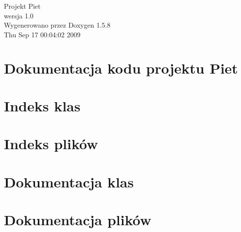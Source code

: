 \documentclass[a4paper]{book}
\begin{document}
\begin{titlepage}
\vspace*{7cm}
\begin{center}
{\Large Projekt Piet \\[1ex]\large wersja 1.0 }\\
\vspace*{1cm}
{\large Wygenerowano przez Doxygen 1.5.8}\\
\vspace*{0.5cm}
{\small Thu Sep 17 00:04:02 2009}\\
\end{center}
\end{titlepage}
\clearemptydoublepage
{}
\tableofcontents
\clearemptydoublepage
{}
\chapter{Dokumentacja kodu projektu Piet}
\label{index}\hypertarget{index}{}
\chapter{Indeks klas}

\chapter{Indeks plików}

\chapter{Dokumentacja klas}






\chapter{Dokumentacja plików}
















\printindex
\end{document}
